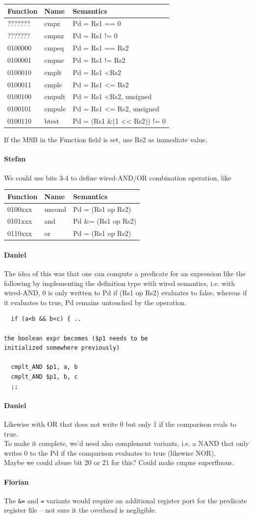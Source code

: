 \documentclass{IEEEtran}
\newcommand{\comment}[3]{\paragraph*{\textbf{#1}}{\color{#3}#2}}
\newcommand{\stefan}[1]{\comment{Stefan}{#1}{RoyalPurple}}
\newcommand{\daniel}[1]{\comment{Daniel}{#1}{RoyalBlue}}
\newcommand{\fb}[1]{\comment{Florian}{#1}{Emerald}}
\newcommand{\OR}{\textbar\xspace}
\newcommand{\AND}{\&\xspace}
\newcommand{\shl}{\textless$\!$\textless\xspace}
\begin{document}
\begin{itemize}
\begin{tabular}{lll}
Function & Name & Semantics \\ \hline
??????? & cmpz  & Pd = Rs1 ==  0 \\
??????? & cmpnz  & Pd = Rs1 !=  0 \\
0100000 & cmpeq  & Pd = Rs1 ==  Rs2 \\
0100001 & cmpne  & Pd = Rs1 != Rs2 \\
0100010 & cmplt  & Pd = Rs1 \textless Rs2 \\
0100011 & cmple  & Pd = Rs1 \textless= Rs2 \\
0100100 & cmpult & Pd = Rs1 \textless Rs2, unsigned \\
0100101 & cmpule & Pd = Rs1 \textless= Rs2, unsigned \\
0100110 & btest  & Pd = (Rs1 \AND (1 \shl Rs2)) != 0 \\
\end{tabular}

If the MSB in the Function field is set, use Rs2 as immediate value.

\stefan{We could use bits 3-4 to define wired-AND/OR combination operation, like

\begin{tabular}{lll}
Function & Name & Semantics \\ \hline
0100xxx & uncond & Pd = (Rs1 op Rs2) \\
0101xxx & and    & Pd \AND= (Rs1 op Rs2) \\
0110xxx & or     & Pd \OR= (Rs1 op Rs2) \\
\end{tabular}
}

\daniel{The idea of this was that one can compute a predicate for an expression like
the following by implementing the definition type with wired semantics,
i.e. with wired-AND, 0 is only written to Pd if (Rs1 op Rs2) evaluates to false,
whereas if it evaluates to true, Pd remains untouched by the operation.
}
\begin{verbatim}
  if (a<b && b<c) { ..

the boolean expr becomes ($p1 needs to be
initialized somewhere previously)

  cmplt_AND $p1, a, b
  cmplt_AND $p1, b, c
  ;;
\end{verbatim}

\daniel{Likewise with OR that does not write 0 but only 1 if the comparison evals to true.\\
To make it complete, we'd need also complement variants, i.e. a NAND that
only writes 0 to the Pd if the comparison evaluates to true (likewise NOR).\\
Maybe we could abuse bit 20 or 21 for this? Could make cmpne superfluous.
}
\fb{The \texttt{\&=} and \texttt{\textbar=} variants would require an additional
    register port for the predicate register file -- not sure it the overhead is
    negligible.}


\end{itemize}
\end{document}
